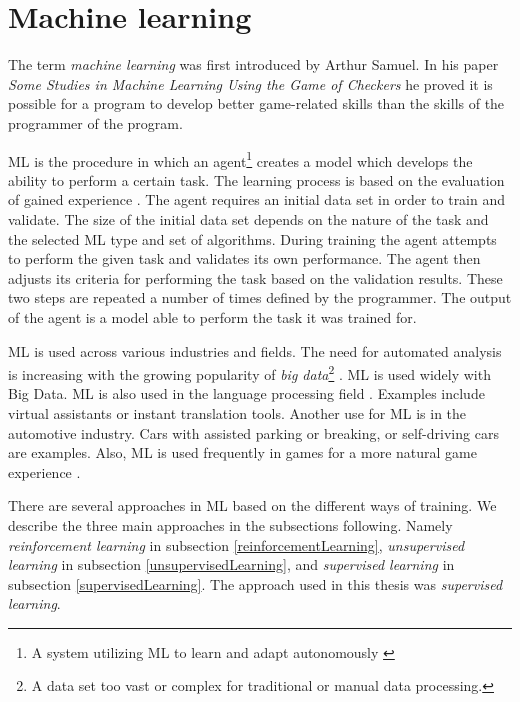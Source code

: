 \section{Machine learning} \label{machineLearning}
The term \textit{machine learning} was first introduced by Arthur Samuel. In his paper \textit{Some Studies in Machine Learning Using the Game of Checkers} \cite{machineLearningOriginal} he proved it is possible for a program to develop better game-related skills than the skills of the programmer of the program.

ML is the procedure in which an agent\footnote{A system utilizing ML to learn and adapt autonomously \cite{machineLeraningApproaches}} creates a model which develops the ability to perform a certain task. The learning process is based on the evaluation of gained experience \cite{machineLearningToday}. The agent requires an initial data set in order to train and validate. The size of the initial data set depends on the nature of the task and the selected ML type and set of algorithms. During training the agent attempts to perform the given task and validates its own performance. The agent then adjusts its criteria for performing the task based on the validation results. These two steps are repeated a number of times defined by the programmer. The output of the agent is a model able to perform the task it was trained for. 

ML is used across various industries and fields. The need for automated analysis is increasing with the growing popularity of \textit{big data}\footnote{A data set too vast or complex for traditional or manual data processing.} \cite{bigDataExplained} \cite{bigDataPopularity}. ML is used widely with Big Data. ML is also used in the language processing field \cite{machineLearningToday}. Examples include virtual assistants or instant translation tools. Another use for ML is in the automotive industry. Cars with assisted parking or breaking, or self-driving cars are examples\cite{selfDrivingCars}. Also, ML is used frequently in games for a more natural game experience \cite{machineLearningGaming}. 

There are several approaches in ML based on the different ways of training. We describe the three main approaches in the subsections following. Namely \textit{reinforcement learning} in subsection \ref{reinforcementLearning}, \textit{unsupervised learning} in subsection \ref{unsupervisedLearning}, and \textit{supervised learning} in subsection \ref{supervisedLearning}. The approach used in this thesis was \textit{supervised learning}. 

